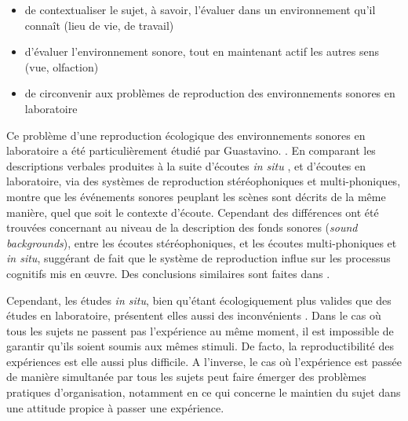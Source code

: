 \begin{itemize}
\item  de contextualiser le sujet, à savoir, l'évaluer dans un environnement qu'il connaît  (lieu de vie, de travail)
\item d'évaluer l'environnement sonore, tout en maintenant actif les autres sens (vue, olfaction)
\item de circonvenir aux problèmes de reproduction des environnements sonores en laboratoire
\end{itemize}

Ce problème d'une reproduction écologique des environnements sonores en laboratoire a été particulièrement étudié par Guastavino. \citep{guastavino2003approche,guastavino2004perceptual,guastavino2005ecological}. En comparant les descriptions verbales produites à la suite d'écoutes \emph{in situ} , et d'écoutes en laboratoire, via des systèmes de reproduction stéréophoniques et multi-phoniques, \citep{guastavino2005ecological} montre que les événements sonores peuplant les scènes sont décrits de la même manière, quel que soit le contexte d'écoute. Cependant des différences ont été trouvées concernant  au niveau de la description des fonds sonores (\emph{sound backgrounds}), entre les écoutes stéréophoniques, et les écoutes multi-phoniques et \emph{in situ}, suggérant de fait que le système de reproduction influe sur les processus cognitifs mis en œuvre. Des conclusions similaires sont faites dans \citep{guastavino2004perceptual}  .

Cependant, les études \emph{in situ}, bien qu'étant écologiquement plus valides que des études en laboratoire, présentent elles aussi des inconvénients . Dans le cas où tous les sujets ne passent pas l'expérience au même moment, il est impossible de garantir qu'ils soient soumis aux mêmes stimuli. De facto, la reproductibilité des expériences est elle aussi plus difficile. A l'inverse, le cas où l'expérience est passée de manière simultanée par tous les sujets peut faire émerger des problèmes pratiques d'organisation, notamment en ce qui concerne le maintien du sujet dans une attitude propice à passer une expérience.


